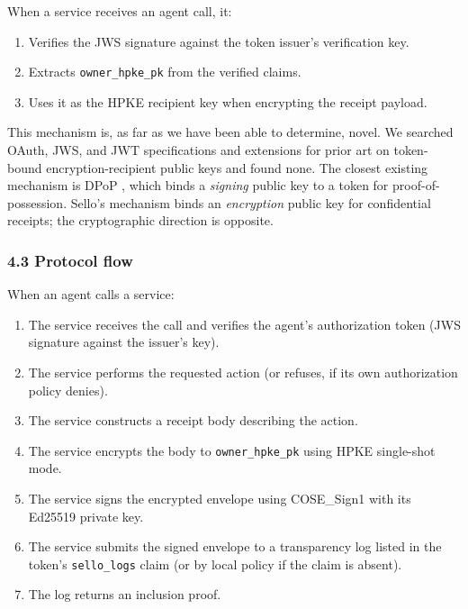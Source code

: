 \documentclass[
  11pt,
]{article}
\providecommand{\tightlist}{%
  \setlength{\itemsep}{0pt}\setlength{\parskip}{0pt}}
\begin{document}
When a service receives an agent call, it:

\begin{enumerate}
\def\labelenumi{\arabic{enumi}.}
\tightlist
\item
  Verifies the JWS signature against the token issuer's verification
  key.
\item
  Extracts \texttt{owner\_hpke\_pk} from the verified claims.
\item
  Uses it as the HPKE recipient key when encrypting the receipt payload.
\end{enumerate}

This mechanism is, as far as we have been able to determine, novel. We
searched OAuth, JWS, and JWT specifications and extensions for prior art
on token-bound encryption-recipient public keys and found none. The
closest existing mechanism is DPoP \citep{RFC9449}, which binds a
\emph{signing} public key to a token for proof-of-possession. Sello's
mechanism binds an \emph{encryption} public key for confidential
receipts; the cryptographic direction is opposite.

\hypertarget{protocol-flow}{%
\subsubsection{4.3 Protocol flow}\label{protocol-flow}}

When an agent calls a service:

\begin{enumerate}
\def\labelenumi{\arabic{enumi}.}
\tightlist
\item
  The service receives the call and verifies the agent's authorization
  token (JWS signature against the issuer's key).
\item
  The service performs the requested action (or refuses, if its own
  authorization policy denies).
\item
  The service constructs a receipt body describing the action.
\item
  The service encrypts the body to \texttt{owner\_hpke\_pk} using HPKE
  single-shot mode.
\item
  The service signs the encrypted envelope using COSE\_Sign1 with its
  Ed25519 private key.
\item
  The service submits the signed envelope to a transparency log listed
  in the token's \texttt{sello\_logs} claim (or by local policy if the
  claim is absent).
\item
  The log returns an inclusion proof.
\end{enumerate}
\end{document}
